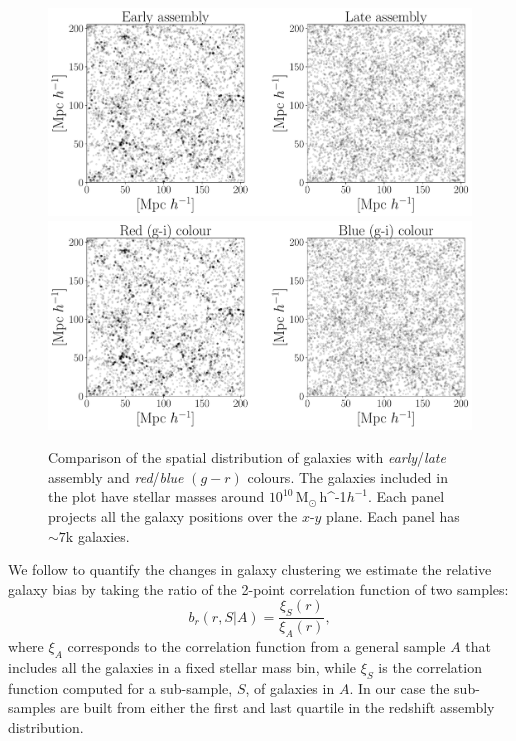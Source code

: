 \documentclass[fleqn,usenatbib]{mnras}
\newcommand{\Msunh}{\,{\rm M}$_{\odot}$\,\ifmmode h^{-1}\else $h^{-1}$\fi}
\begin{document}
\begin{figure}
    \centering
    \includegraphics[width=1.5\columnwidth]{figuras/scatter_assembly.pdf}
    \includegraphics[width=1.5\columnwidth]{figuras/scatter_color.pdf}
    \caption{Comparison of the spatial distribution of galaxies with 
      \emph{early}/\emph{late} assembly and \emph{red}/\emph{blue}
      $(g-r)$ colours.
      The galaxies included in the plot have stellar masses around
      $10^{10}$\Msunh.  
      Each panel projects all the galaxy positions over the $x$-$y$
      plane.  
    Each panel has $\sim7$k galaxies. }
    \label{fig:comparison}
\end{figure}


We follow \cite{2020MNRAS.tmp.1844M} to quantify the changes in galaxy
clustering we estimate the relative galaxy bias by taking the ratio of
the 2-point correlation function of two samples: 
%
\begin{equation}
b_r(r, S|A)= \frac{\xi_S(r)}{\xi_A(r)}, 
\label{eq:relative}
\end{equation}
%
where $\xi_A$ corresponds to the correlation function from a general
sample $A$ that includes all the galaxies in a fixed stellar mass bin,
while $\xi_S$ is the correlation function computed for a sub-sample,
$S$, of galaxies in $A$. 
In our case the sub-samples are built from either the first and last
quartile in the redshift assembly distribution. 
\end{document}
